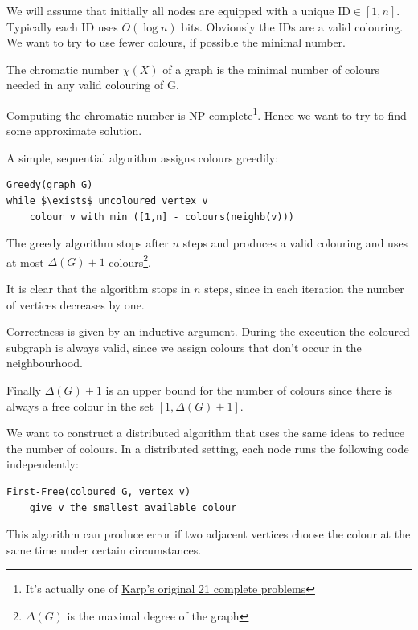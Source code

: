 We will assume that initially all nodes are equipped with a unique ID$\in [1,n]$. Typically each ID uses $O(\log n)$ bits. Obviously the IDs are a valid colouring. We want to try to use fewer colours, if possible the minimal number.

\begin{Def} The chromatic number $\chi(X)$ of a graph is the minimal number of colours needed in any valid colouring of G.
\end{Def}

Computing the chromatic number is NP-complete\footnote{It's actually one of \href{http://www.cs.berkeley.edu/~luca/cs172/karp.pdf}{Karp's original 21 complete problems}}. Hence we want to try to find some approximate solution.

A simple, sequential algorithm assigns colours greedily:

\begin{lstlisting}
Greedy(graph G)
while $\exists$ uncoloured vertex v
	colour v with min ([1,n] - colours(neighb(v)))
\end{lstlisting}

\begin{thm} The greedy algorithm stops after $n$ steps and produces a valid colouring and uses at most $\Delta(G)+1$ colours\footnote{$\Delta(G)$ is the maximal degree of the graph}.
\end{thm}

\begin{pr} It is clear that the algorithm stops in $n$ steps, since in each iteration the number of vertices decreases by one. 

Correctness is given by an inductive argument. During the execution the coloured subgraph is always valid, since we assign colours that don't occur in the neighbourhood.

Finally $\Delta(G)+1$ is an upper bound for the number of colours since there is always a free colour in the set $[1,\Delta(G)+1]$.
\end{pr}

We want to construct a distributed algorithm that uses the same ideas to reduce the number of colours. In a distributed setting, each node runs the following code independently:

\begin{lstlisting}
First-Free(coloured G, vertex v)
	give v the smallest available colour
\end{lstlisting}

This algorithm can produce error if two adjacent vertices choose the colour at the same time under certain circumstances.

